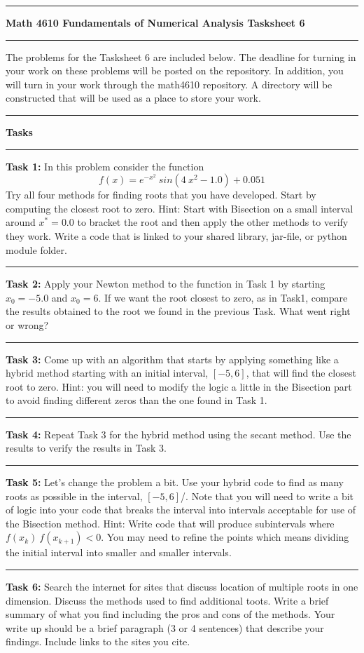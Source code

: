 \documentclass[10pt,fleqn]{article}
\begin{document}
\vskip0.1in\hrule\vskip0.1in \noindent
{\bf{\Large Math 4610 Fundamentals of Numerical Analysis Tasksheet 6}}
\vskip0.1in\hrule\vskip0.1in \noindent
The problems for the Tasksheet 6 are included below. The deadline for turning
in your work on these problems will be posted on the repository. In addition,
you will turn in your work through the math4610 repository. A directory will be
constructed that will be used as a place to store your work.
\vskip0.1in\hrule\vskip0.1in \noindent
{\bf{\large Tasks}}
\vskip0.1in\hrule\vskip0.1in \noindent
\begin{trivlist}
  \item[\bf Task 1:]
    In this problem consider the function
    \[
      f(x) = e^{-x^2}\ sin(4\ x^2-1.0) + 0.051
    \]
    Try all four methods for finding roots that you have developed. Start by
    computing the closest root to zero. Hint: Start with Bisection on a small
    interval around \(x^*=0.0\) to bracket the root and then apply the other
    methods to verify they work. Write a code that is linked to your shared
    library, jar-file, or python module folder.
\vskip0.1in\hrule\vskip0.1in \noindent
  \item[\bf Task 2:] Apply your Newton method to the function in Task 1 by
    starting \(x_0=-5.0\) and \(x_0=6\). If we want the root closest to zero, as
    in Task1, compare the results obtained to the root we found in the previous
    Task. What went right or wrong?
\vskip0.1in\hrule\vskip0.1in \noindent
  \item[\bf Task 3:] Come up with an algorithm that starts by applying something
    like a hybrid method starting with an initial interval, \([-5,6]\), that
    will find the closest root to zero. Hint: you will need to modify the logic
    a little in the Bisection part to avoid finding different zeros than the one
    found in Task 1.
\vskip0.1in\hrule\vskip0.1in \noindent
  \item[\bf Task 4:] Repeat Task 3 for the hybrid method using the secant
    method. Use the results to verify the results in Task 3.
\vskip0.1in\hrule\vskip0.1in \noindent
  \item[\bf Task 5:] Let's change the problem a bit. Use your hybrid code to
    find as many roots as possible in the interval, \([-5,6]\)/. Note that you
    will need to write a bit of logic into your code that breaks the interval
    into intervals acceptable for use of the Bisection method. Hint: Write code
    that will produce subintervals where \(f(x_k)\ f(x_{k+1})<0\). You may need
    to refine the points which means dividing the initial interval into smaller
    and smaller intervals.
\vskip0.1in\hrule\vskip0.1in \noindent
  \item[\bf Task 6:] Search the internet for sites that discuss location of
    multiple roots in one dimension. Discuss the methods used to find additional
    toots. Write a brief summary of what you find including the pros and cons of
    the methods. Your write up should be a brief paragraph (3 or 4 sentences)
    that describe your findings. Include links to the sites you cite.
\end{trivlist}
\end{document}
